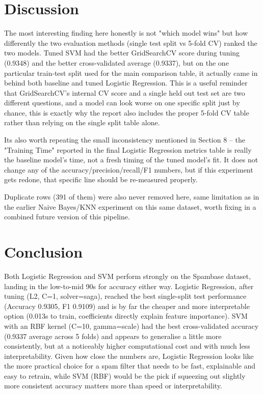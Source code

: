 \documentclass[12pt,a4paper]{article}
\begin{document}
\section{Discussion}
The most interesting finding here honestly is not "which model wins" but how differently the two evaluation methods (single test split vs 5-fold CV) ranked the two models. Tuned SVM had the better GridSearchCV score during tuning (0.9348) and the better cross-validated average (0.9337), but on the one particular train-test split used for the main comparison table, it actually came in behind both baseline and tuned Logistic Regression. This is a useful reminder that GridSearchCV's internal CV score and a single held out test set are two different questions, and a model can look worse on one specific split just by chance, this is exactly why the report also includes the proper 5-fold CV table rather than relying on the single split table alone.

Its also worth repeating the small inconsistency mentioned in Section 8 -- the "Training Time" reported in the final Logistic Regression metrics table is really the baseline model's time, not a fresh timing of the tuned model's fit. It does not change any of the accuracy/precision/recall/F1 numbers, but if this experiment gets redone, that specific line should be re-measured properly.

Duplicate rows (391 of them) were also never removed here, same limitation as in the earlier Naive Bayes/KNN experiment on this same dataset, worth fixing in a combined future version of this pipeline.

\section{Conclusion}
Both Logistic Regression and SVM perform strongly on the Spambase dataset, landing in the low-to-mid 90s for accuracy either way. Logistic Regression, after tuning (L2, C=1, solver=saga), reached the best single-split test performance (Accuracy 0.9305, F1 0.9109) and is by far the cheaper and more interpretable option (0.013s to train, coefficients directly explain feature importance). SVM with an RBF kernel (C=10, gamma=scale) had the best cross-validated accuracy (0.9337 average across 5 folds) and appears to generalise a little more consistently, but at a noticeably higher computational cost and with much less interpretability. Given how close the numbers are, Logistic Regression looks like the more practical choice for a spam filter that needs to be fast, explainable and easy to retrain, while SVM (RBF) would be the pick if squeezing out slightly more consistent accuracy matters more than speed or interpretability.
\end{document}
